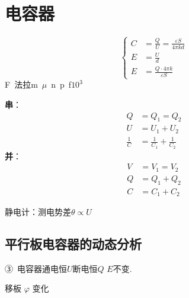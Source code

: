 \section{电容器}
\[
\left\{\begin{aligned}
C&=\frac{Q}{U}=\frac{\varepsilon S}{4\pi kd}\\
E&=\frac{U}{d}\\
E&=\frac{Q\cdot 4\pi k}{\varepsilon S}
\end{aligned}\right.
\]
F\ 法拉\qquad m\ $\mu$\ n\ p\ f\qquad \textcircled{\scriptsize$10^3$}

\begin{minipage}[t]{0.48\linewidth}
\end{minipage}\hfill
\begin{minipage}[t]{0.48\linewidth}
\end{minipage}

\textbf{串}：
\begin{align*}
Q&=Q_1=Q_2\\
U&=U_1+U_2\\
\frac{1}{C}&=\frac{1}{C_1}+\frac{1}{C_2}
\end{align*}
\textbf{并}：
\begin{align*}
V&=V_1=V_2 %
\\
Q&=Q_1+Q_2\\
C&=C_1+C_2
\end{align*}

静电计：测电势差\quad $\theta\propto U$

\subsection{平行板电容器的动态分析}
③\ 电容器\quad 通电恒$U$\quad 断电恒$Q$ $E$不变.

移板 $\varphi$ 变化\quad
{}
\quad
{}

